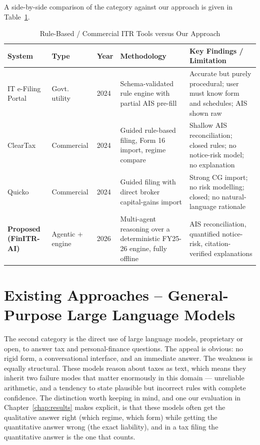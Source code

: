 \documentclass[12pt, a4paper, oneside]{report}
\begin{document}
A side-by-side comparison of the category against our approach is given in
Table~\ref{tab:cat-a-comparison}.

\begin{table}[H]
\centering
\caption{Rule-Based / Commercial ITR Tools versus Our Approach}
\label{tab:cat-a-comparison}
\small
\begin{tabularx}{\textwidth}{|l|l|l|X|X|}
\hline
\textbf{System} & \textbf{Type} & \textbf{Year} & \textbf{Methodology} & \textbf{Key Findings / Limitation} \\
\hline
IT e-Filing Portal \cite{ref1} & Govt. utility & 2024 & Schema-validated rule engine with partial AIS pre-fill & Accurate but purely procedural; user must know form and schedules; AIS shown raw \\
\hline
ClearTax \cite{ref2} & Commercial & 2024 & Guided rule-based filing, Form 16 import, regime compare & Shallow AIS reconciliation; closed rules; no notice-risk model; no explanation \\
\hline
Quicko \cite{ref3} & Commercial & 2024 & Guided filing with direct broker capital-gains import & Strong CG import; no risk modelling; closed; no natural-language rationale \\
\hline
\textbf{Proposed (FinITR-AI)} & Agentic + engine & 2026 & Multi-agent reasoning over a deterministic FY25-26 engine, fully offline & AIS reconciliation, quantified notice-risk, citation-verified explanations \\
\hline
\end{tabularx}
\end{table}

\section{Existing Approaches -- General-Purpose Large Language Models}
\label{sec:category-b}

The second category is the direct use of large language models, proprietary or
open, to answer tax and personal-finance questions. The appeal is obvious: no
rigid form, a conversational interface, and an immediate answer. The weakness is
equally structural. These models reason about taxes as text, which means they
inherit two failure modes that matter enormously in this domain --- unreliable
arithmetic, and a tendency to state plausible but incorrect rules with complete
confidence. The distinction worth keeping in mind, and one our evaluation in
Chapter~\ref{chap:results} makes explicit, is that these models often get the
qualitative answer right (which regime, which form) while getting the
quantitative answer wrong (the exact liability), and in a tax filing the
quantitative answer is the one that counts.
\end{document}
